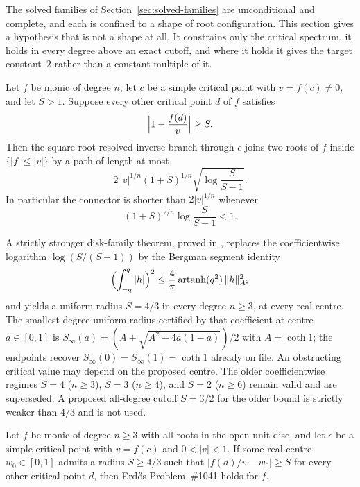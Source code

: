 \documentclass[11pt]{article}
\begin{document}
The solved families of Section~\ref{sec:solved-families} are unconditional and
complete, and each is confined to a shape of root configuration.  This section
gives a hypothesis that is not a shape at all.  It constrains only the critical
spectrum, it holds in every degree above an exact cutoff, and where it holds it
gives the target constant~$2$ rather than a constant multiple of it.

\begin{theorem}\label{res:critical-value-separation}
Let $f$ be monic of degree $n$, let $c$ be a simple critical point with
$v=f(c)\ne0$, and let $S>1$.  Suppose every other critical point $d$ of $f$
satisfies
\[
  \Bigl|1-\frac{f(d)}{v}\Bigr|\ge S .
\]
Then the square-root-resolved inverse branch through $c$ joins two roots of
$f$ inside $\{|f|\le|v|\}$ by a path of length at most
\[
  2\,|v|^{1/n}(1+S)^{1/n}\sqrt{\log\frac{S}{S-1}} .
\]
In particular the connector is shorter than $2|v|^{1/n}$ whenever
\begin{equation}\label{eq:separation-threshold}
  (1+S)^{2/n}\log\frac{S}{S-1}<1 .
\end{equation}
\end{theorem}

\begin{corollary}\label{res:critical-value-thresholds}
A strictly stronger disk-family theorem, proved in
, replaces
the coefficientwise logarithm $\log(S/(S-1))$ by the Bergman segment identity
\[
 \Bigl(\int_{-q}^{q}|h|\Bigr)^2
 \le\frac4\pi\operatorname{artanh}(q^2)\,\|h\|_{A^2}^2
\]
and yields a uniform radius $S=4/3$ in every degree $n\ge3$, at every real
centre.  The smallest degree-uniform radius certified by that coefficient at
centre $a\in[0,1]$ is
$S_\infty(a)=(A+\sqrt{A^2-4a(1-a)})/2$ with $A=\coth 1$; the endpoints recover $S_\infty(0)=S_\infty(1)=\coth1$ already on file.
An obstructing critical value may depend on the proposed centre.  The older
coefficientwise regimes $S=4$ ($n\ge3$), $S=3$ ($n\ge4$), and $S=2$ ($n\ge6$)
remain valid and are superseded.  A proposed all-degree cutoff $S=3/2$ for
the older bound is strictly weaker than $4/3$ and is not used.
\end{corollary}

\begin{corollary}\label{res:separation-parent}
Let $f$ be monic of degree $n\ge3$ with all roots in the open unit disc, and
let $c$ be a simple critical point with $v=f(c)$ and $0<|v|<1$.  If some real centre
$w_0\in[0,1]$ admits a radius $S\ge4/3$ such that $|f(d)/v-w_0|\ge S$ for
every other critical point $d$, then Erd\H{o}s Problem~\#1041 holds for $f$.
\end{corollary}
\end{document}
